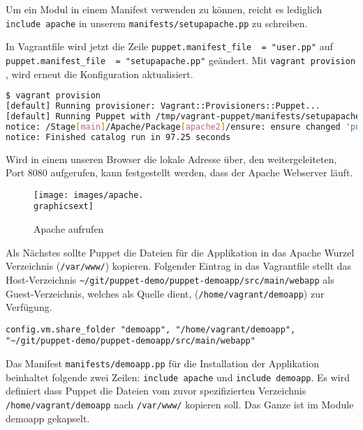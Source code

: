 \documentclass[12pt,a4paper,ngerman]{article}
\begin{document}
Um ein Modul in einem Manifest verwenden zu können, reicht es lediglich \lstinline[language=puppet]$include apache$ in unserem \lstinline$manifests/setupapache.pp$ zu schreiben.

In Vagrantfile wird jetzt die Zeile \lstinline$puppet.manifest_file  = "user.pp"$ auf \lstinline$puppet.manifest_file  = "setupapache.pp"$ geändert. Mit \lstinline$vagrant provision$ , wird erneut die Konfiguration aktualisiert.

\begin{lstlisting}[language=sh,caption=vagrant provisioning für Apache, label=provisioning_apache]
$ vagrant provision
[default] Running provisioner: Vagrant::Provisioners::Puppet...
[default] Running Puppet with /tmp/vagrant-puppet/manifests/setupapache.pp...
notice: /Stage[main]/Apache/Package[apache2]/ensure: ensure changed 'purged' to 'present'
notice: Finished catalog run in 97.25 seconds
\end{lstlisting}

Wird in einem unseren Browser die lokale Adresse über, den weitergeleiteten, Port 8080 aufgerufen, kann festgestellt werden, dass der Apache Webserver läuft.
\begin{figure}
  \begin{center}
    \texttt{[image: images/apache.\\graphicsext]}
  \end{center}
  \caption{Apache aufrufen}
  \label{apache}
\end{figure}

Als Nächstes sollte Puppet die Dateien für die Applikation in das Apache Wurzel Verzeichnis (\lstinline$/var/www/$) kopieren. Folgender Eintrag in das Vagrantfile stellt das Host-Verzeichnis \lstinline$~/git/puppet-demo/puppet-demoapp/src/main/webapp$ als Guest-Verzeichnis, welches als Quelle dient, (\lstinline$/home/vagrant/demoapp$) zur Verfügung.

\begin{lstlisting}[language=vagrant,caption=Shared folders in Vagrantfile konfigurieren, label=sharedfolders]
config.vm.share_folder "demoapp", "/home/vagrant/demoapp", "~/git/puppet-demo/puppet-demoapp/src/main/webapp"
\end{lstlisting}

Das Manifest \lstinline$manifests/demoapp.pp$ für die Installation der Applikation beinhaltet folgende zwei Zeilen: \lstinline[language=puppet]$include apache$ und  \lstinline[language=puppet]$include demoapp$. Es wird definiert dass Puppet die Dateien vom zuvor spezifizierten Verzeichnis \lstinline$/home/vagrant/demoapp$ nach \lstinline$/var/www/$ kopieren soll. Das Ganze ist im Module demoapp gekapselt.
\end{document}
